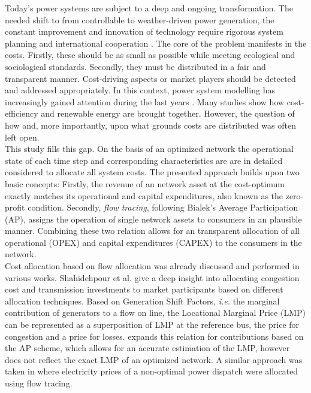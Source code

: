 \documentclass[11pt,twocolumn]{article}
\newcommand{\ie}{\textit{i.e.} }
\begin{document}
Today's power systems are subject to a deep and ongoing transformation. The needed shift to from controllable to weather-driven power generation, the constant improvement and innovation of technology require rigorous system planning and international cooperation \cite{pfenninger_energy_2014,schlachtberger_benefits_2017}. The core of the problem manifests in the costs. Firstly, these should be as small as possible while meeting ecological and sociological standards. Secondly, they must be distributed in a fair and transparent manner. Cost-driving aspects or market players should be detected and addressed appropriately. 
In this context, power system modelling has increasingly gained attention during the last years \cite{bazmi_sustainable_2011,pfenninger_energy_2014,pereira_generation_2017}. Many studies show how cost-efficiency and renewable energy are brought together. However, the question of how and, more importantly, upon what grounds costs are distributed was often left open. \\
This study fills this gap. On the basis of an optimized network the operational state of each time step and corresponding characteristics are are in detailed considered to allocate all system costs. The presented approach builds upon two basic concepts: Firstly, the revenue of an network asset at the cost-optimum exactly matches its operational and capital expenditures, also known as the zero-profit condition. Secondly, \textit{flow tracing}, following Bialek's Average Participation (AP), assigns the operation of single network assets to consumers in an plausible manner. 
Combining these two relation allows for an transparent allocation of all operational (OPEX) and capital expenditures (CAPEX) to the consumers in the network. \\
Cost allocation based on flow allocation was already discussed and performed in various works. Shahidehpour et al. give a deep insight into allocating congestion cost and transmission investments to market participants \cite{shahidehpour_market_2002} based on different allocation techniques. Based on Generation Shift Factors, \ie the marginal contribution of generators to a flow on line, the Locational Marginal Price (LMP) can be represented as a superposition of LMP at the reference bus, the price for congestion and a price for losses. \cite{meng_investigation_2007} expands this relation for contributions based on the AP scheme, which allows for an accurate estimation of the LMP, however does not reflect the exact LMP of an optimized network. A similar approach was taken in \cite{tranberg_flow-based_2018} where electricity prices of a non-optimal power dispatch were allocated using flow tracing. 
\end{document}
